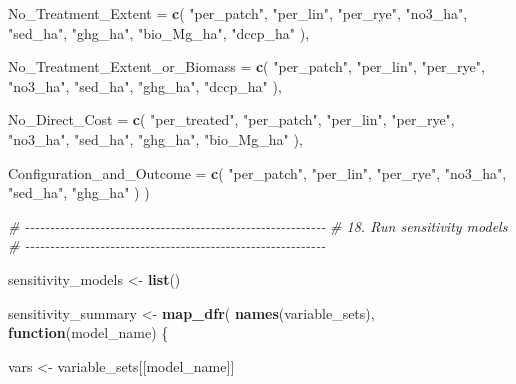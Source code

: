 \documentclass[
]{article}
\newenvironment{Shaded}{\begin{snugshade}}{\end{snugshade}}
\newcommand{\AttributeTok}[1]{\textcolor[rgb]{0.13,0.29,0.53}{#1}}
\newcommand{\CommentTok}[1]{\textcolor[rgb]{0.56,0.35,0.01}{\textit{#1}}}
\newcommand{\ControlFlowTok}[1]{\textcolor[rgb]{0.13,0.29,0.53}{\textbf{#1}}}
\newcommand{\FunctionTok}[1]{\textcolor[rgb]{0.13,0.29,0.53}{\textbf{#1}}}
\newcommand{\NormalTok}[1]{#1}
\newcommand{\OtherTok}[1]{\textcolor[rgb]{0.56,0.35,0.01}{#1}}
\newcommand{\StringTok}[1]{\textcolor[rgb]{0.31,0.60,0.02}{#1}}
\begin{document}
\begin{Shaded}
\begin{Highlighting}[]
  \AttributeTok{No\_Treatment\_Extent =} \FunctionTok{c}\NormalTok{(}
    \StringTok{"per\_patch"}\NormalTok{,}
    \StringTok{"per\_lin"}\NormalTok{,}
    \StringTok{"per\_rye"}\NormalTok{,}
    \StringTok{"no3\_ha"}\NormalTok{,}
    \StringTok{"sed\_ha"}\NormalTok{,}
    \StringTok{"ghg\_ha"}\NormalTok{,}
    \StringTok{"bio\_Mg\_ha"}\NormalTok{,}
    \StringTok{"dccp\_ha"}
\NormalTok{  ),}

  \AttributeTok{No\_Treatment\_Extent\_or\_Biomass =} \FunctionTok{c}\NormalTok{(}
    \StringTok{"per\_patch"}\NormalTok{,}
    \StringTok{"per\_lin"}\NormalTok{,}
    \StringTok{"per\_rye"}\NormalTok{,}
    \StringTok{"no3\_ha"}\NormalTok{,}
    \StringTok{"sed\_ha"}\NormalTok{,}
    \StringTok{"ghg\_ha"}\NormalTok{,}
    \StringTok{"dccp\_ha"}
\NormalTok{  ),}

  \AttributeTok{No\_Direct\_Cost =} \FunctionTok{c}\NormalTok{(}
    \StringTok{"per\_treated"}\NormalTok{,}
    \StringTok{"per\_patch"}\NormalTok{,}
    \StringTok{"per\_lin"}\NormalTok{,}
    \StringTok{"per\_rye"}\NormalTok{,}
    \StringTok{"no3\_ha"}\NormalTok{,}
    \StringTok{"sed\_ha"}\NormalTok{,}
    \StringTok{"ghg\_ha"}\NormalTok{,}
    \StringTok{"bio\_Mg\_ha"}
\NormalTok{  ),}

  \AttributeTok{Configuration\_and\_Outcome =} \FunctionTok{c}\NormalTok{(}
    \StringTok{"per\_patch"}\NormalTok{,}
    \StringTok{"per\_lin"}\NormalTok{,}
    \StringTok{"per\_rye"}\NormalTok{,}
    \StringTok{"no3\_ha"}\NormalTok{,}
    \StringTok{"sed\_ha"}\NormalTok{,}
    \StringTok{"ghg\_ha"}
\NormalTok{  )}
\NormalTok{)}


\CommentTok{\# {-}{-}{-}{-}{-}{-}{-}{-}{-}{-}{-}{-}{-}{-}{-}{-}{-}{-}{-}{-}{-}{-}{-}{-}{-}{-}{-}{-}{-}{-}{-}{-}{-}{-}{-}{-}{-}{-}{-}{-}{-}{-}{-}{-}{-}{-}{-}{-}{-}{-}{-}{-}{-}{-}{-}{-}{-}{-}{-}{-}}
\CommentTok{\# 18. Run sensitivity models}
\CommentTok{\# {-}{-}{-}{-}{-}{-}{-}{-}{-}{-}{-}{-}{-}{-}{-}{-}{-}{-}{-}{-}{-}{-}{-}{-}{-}{-}{-}{-}{-}{-}{-}{-}{-}{-}{-}{-}{-}{-}{-}{-}{-}{-}{-}{-}{-}{-}{-}{-}{-}{-}{-}{-}{-}{-}{-}{-}{-}{-}{-}{-}}

\NormalTok{sensitivity\_models }\OtherTok{\textless{}{-}} \FunctionTok{list}\NormalTok{()}

\NormalTok{sensitivity\_summary }\OtherTok{\textless{}{-}} \FunctionTok{map\_dfr}\NormalTok{(}
  \FunctionTok{names}\NormalTok{(variable\_sets),}
  \ControlFlowTok{function}\NormalTok{(model\_name) \{}

\NormalTok{    vars }\OtherTok{\textless{}{-}}\NormalTok{ variable\_sets[[model\_name]]}


\end{Highlighting}
\end{Shaded}
\end{document}
